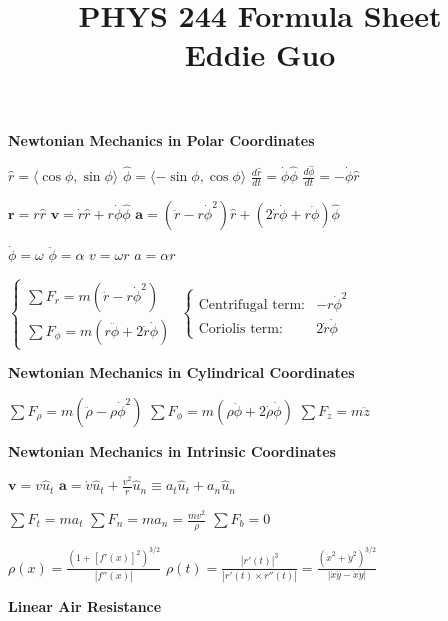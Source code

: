\documentclass[twocolumn]{article}
\title{
	\vspace{-2em}
	\normalsize \textbf{PHYS 244 Formula Sheet} \\
	\small Eddie Guo \\
	\dotfill
	\vspace{-5em}
}
\date{}
\begin{document}
\maketitle

\small

\textbf{Newtonian Mechanics in Polar Coordinates}

$\hat{r} = \langle \cos \phi, \sin \phi \rangle$ \hfill $\hat{\phi} = \langle -\sin \phi, \cos \phi \rangle$ \hfill $\frac{d\hat{r}}{dt} = \dot{\phi} \hat{\phi}$ \hfill $\frac{d\hat{\phi}}{dt} = -\dot{\phi} \hat{r}$

$\mathbf{r} = r \hat{r}$ \hfill $\mathbf{v} = \dot{r} \hat{r} + r \dot{\phi} \hat{\phi}$ \hfill $\mathbf{a} = (\ddot{r} - r \dot{\phi}^2) \hat{r} + (2 \dot{r} \dot{\phi} + r \ddot{\phi}) \hat{\phi}$

$\dot{\phi} = \omega$ \hfill $\ddot{\phi} = \alpha$ \hfill $v = \omega r$ \hfill $a = \alpha r$

$\begin{cases}
    \sum F_r = m(\ddot{r} - r\dot{\phi}^2) \\
    \sum F_\phi = m(r \ddot{\phi} + 2 \dot{r} \dot{\phi})
\end{cases}$
\hfill
$\begin{cases}
    \text{Centrifugal term:} & -r \dot{\phi}^2 \\
    \text{Coriolis term:} & 2 \dot{r} \dot{\phi}
\end{cases}$

\dotfill

\textbf{Newtonian Mechanics in Cylindrical Coordinates}

$\sum F_\rho = m(\ddot{\rho} - \rho \dot{\phi}^2)$ \hfill $\sum F_\phi = m(\rho \ddot{\phi} + 2 \dot{\rho} \dot{\phi})$ \hfill $\sum F_z = m \ddot{z}$

\dotfill

\textbf{Newtonian Mechanics in Intrinsic Coordinates}

$\mathbf{v} = v \hat{u}_t$ \hfill $\mathbf{a} = \dot{v} \hat{u}_t + \frac{v^2}{r} \hat{u}_n \equiv a_t \hat{u}_t + a_n \hat{u}_n$

$\sum F_t = ma_t$ \hfill $\sum F_n = ma_n = \frac{mv^2}{\rho}$ \hfill $\sum F_b = 0$

$\rho(x) = \frac{(1 + [f'(x)]^2)^{3/2}}{|f''(x)|}$ \hfill $\rho(t) = \frac{| r'(t) |^3}{| r'(t) \times r''(t) |} = \frac{(\dot{x}^2 + \dot{y}^2 )^{3/2}}{|\dot{x} \ddot{y} - \ddot{x} \dot{y}|}$

\dotfill

\textbf{Linear Air Resistance}
\end{document}
